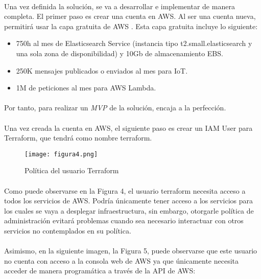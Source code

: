 \documentclass[../../memoria.tex]{subfiles}
\begin{document}
\paragraph{}
Una vez definida la solución, se va a desarrollar e implementar de manera completa. El primer paso es crear una cuenta en AWS. Al ser una cuenta nueva, permitirá usar la capa gratuita de AWS \cite{awsfreetier}. Esta capa gratuita incluye lo siguiente:

\begin{itemize}
    \item 750h al mes de Elasticsearch Service (instancia tipo t2.small.elasticsearch y una sola zona de disponibilidad) y 10Gb de almacenamiento EBS.
    \item 250K mensajes publicados o enviados al mes para IoT.
    \item 1M de peticiones al mes para AWS Lambda.
\end{itemize}

\paragraph{}
Por tanto, para realizar un \textit{MVP} de la solución, encaja a la perfección.

\paragraph{}
Una vez creada la cuenta en AWS, el siguiente paso es crear un IAM User para Terraform, que tendrá como nombre terraform.

\begin{figure}[H]
    \centering
    \texttt{[image: figura4.png]}
    \caption{Política del usuario Terraform}
    \label{fig:figura4}
\end{figure}

\paragraph{}
Como puede observarse en la Figura 4, el usuario terraform necesita acceso a todos los servicios de AWS. Podría únicamente tener acceso a los servicios para los cuales se vaya a desplegar infraestructura, sin embargo, otorgarle política de administración evitará problemas cuando sea necesario interactuar con otros servicios no contemplados en su política.

\paragraph{}
Asimismo, en la siguiente imagen, la Figura 5, puede observarse que este usuario no cuenta con acceso a la consola web de AWS ya que únicamente necesita acceder de manera programática a través de la API de AWS:
\end{document}
